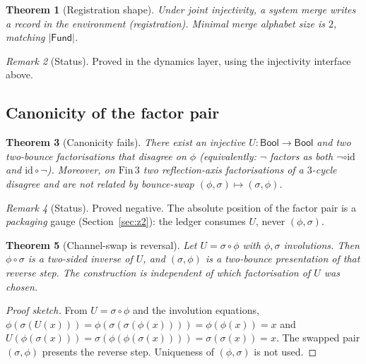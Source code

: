 \documentclass[11pt,a4paper]{article}
\theoremstyle{plain}
\newtheorem{theorem}{Theorem}[section]
\theoremstyle{definition}
\theoremstyle{remark}
\newtheorem{remark}[theorem]{Remark}
\newcommand{\Fund}{\mathsf{Fund}}
\newcommand{\Bool}{\mathsf{Bool}}
\newcommand{\comp}{\circ}
\begin{document}
\begin{theorem}[Registration shape]
\label{thm:reg}
Under joint injectivity, a system merge writes a record in the
environment (registration). Minimal merge alphabet size is $2$, matching
$|\Fund|$.
\end{theorem}

\begin{remark}[Status]
Proved in the dynamics layer, using the injectivity interface above.
\end{remark}

\subsection{Canonicity of the factor pair}

\begin{theorem}[Canonicity fails]
\label{thm:canonfail}
There exist an injective $U:\Bool\to\Bool$ and two two-bounce
factorisations that disagree on $\phi$ (equivalently: $\neg$ factors as
both $\neg\comp\mathrm{id}$ and $\mathrm{id}\comp\neg$).
Moreover, on $\mathrm{Fin}\,3$ two reflection-axis factorisations of a
$3$-cycle disagree and are not related by bounce-swap
$(\phi,\sigma)\mapsto(\sigma,\phi)$.
\end{theorem}

\begin{remark}[Status]
Proved negative. The absolute position of the factor pair is a
\emph{packaging} gauge (Section~\ref{sec:z2}): the ledger consumes $U$,
never $(\phi,\sigma)$.
\end{remark}

\begin{theorem}[Channel-swap is reversal]
\label{thm:swap}
Let $U=\sigma\comp\phi$ with $\phi,\sigma$ involutions. Then
$\phi\comp\sigma$ is a two-sided inverse of $U$, and $(\sigma,\phi)$ is
a two-bounce presentation of that reverse step. The construction is
independent of which factorisation of $U$ was chosen.
\end{theorem}

\begin{proof}[Proof sketch]
From $U=\sigma\comp\phi$ and the involution equations,
$\phi(\sigma(U(x)))=\phi(\sigma(\sigma(\phi(x))))=\phi(\phi(x))=x$ and
$U(\phi(\sigma(x)))=\sigma(\phi(\phi(\sigma(x))))=\sigma(\sigma(x))=x$.
The swapped pair $(\sigma,\phi)$ presents the reverse step. Uniqueness
of $(\phi,\sigma)$ is not used.
\end{proof}
\end{document}
